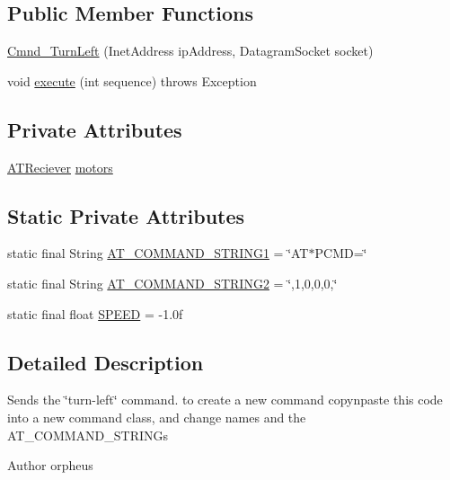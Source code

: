\subsection*{Public Member Functions}
\begin{DoxyCompactItemize}
\item 
\hyperlink{class_drone_1_1_drone_commands_1_1_cmnd___turn_left_acb76c1a77ccd3e4a70c5749acdcc2c23}{Cmnd\+\_\+\+Turn\+Left} (Inet\+Address ip\+Address, Datagram\+Socket socket)
\item 
void \hyperlink{class_drone_1_1_drone_commands_1_1_cmnd___turn_left_a584d6d5eb48dfaa91d5411eaf1205d5b}{execute} (int sequence)  throws Exception  	
\end{DoxyCompactItemize}
\subsection*{Private Attributes}
\begin{DoxyCompactItemize}
\item 
\hyperlink{class_drone_1_1_hardware_1_1_a_t_reciever}{A\+T\+Reciever} \hyperlink{class_drone_1_1_drone_commands_1_1_cmnd___turn_left_a827f219ec9b297ac00291f9a45585b9e}{motors}
\end{DoxyCompactItemize}
\subsection*{Static Private Attributes}
\begin{DoxyCompactItemize}
\item 
static final String \hyperlink{class_drone_1_1_drone_commands_1_1_cmnd___turn_left_ac6aa679805a4d2bf801df186028be993}{A\+T\+\_\+\+C\+O\+M\+M\+A\+N\+D\+\_\+\+S\+T\+R\+I\+N\+G1} = \char`\"{}A\+T$\ast$P\+C\+M\+D=\char`\"{}
\item 
static final String \hyperlink{class_drone_1_1_drone_commands_1_1_cmnd___turn_left_af1b62e231fb35696a0fa19d64a5fbb82}{A\+T\+\_\+\+C\+O\+M\+M\+A\+N\+D\+\_\+\+S\+T\+R\+I\+N\+G2} = \char`\"{},1,0,0,0,\char`\"{}
\item 
static final float \hyperlink{class_drone_1_1_drone_commands_1_1_cmnd___turn_left_a1d83061bcca66aba8fb5e95296369786}{S\+P\+E\+E\+D} = -\/1.\+0f
\end{DoxyCompactItemize}


\subsection{Detailed Description}
Sends the \char`\"{}turn-\/left\char`\"{} command. to create a new command copy\textquotesingle{}n\textquotesingle{}paste this code into a new command class, and change names and the A\+T\+\_\+\+C\+O\+M\+M\+A\+N\+D\+\_\+\+S\+T\+R\+I\+N\+G\textquotesingle{}s \begin{DoxyAuthor}{Author}
orpheus 
\end{DoxyAuthor}


